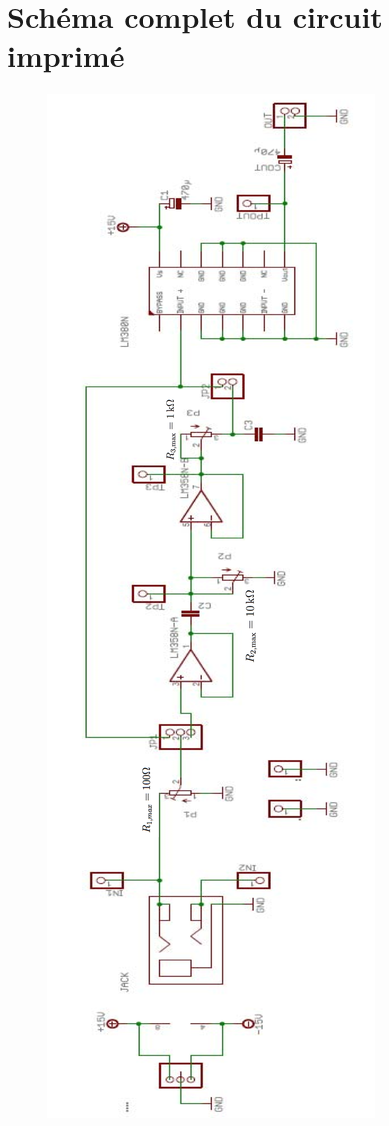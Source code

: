 \chapter{Schéma complet du circuit imprimé}
\label{circuitcomplet}	

\begin{figure}[h!]
\begin{center}
\includegraphics[scale=0.5]{img/circuitcomplet} 
\end{center}
\end{figure}

